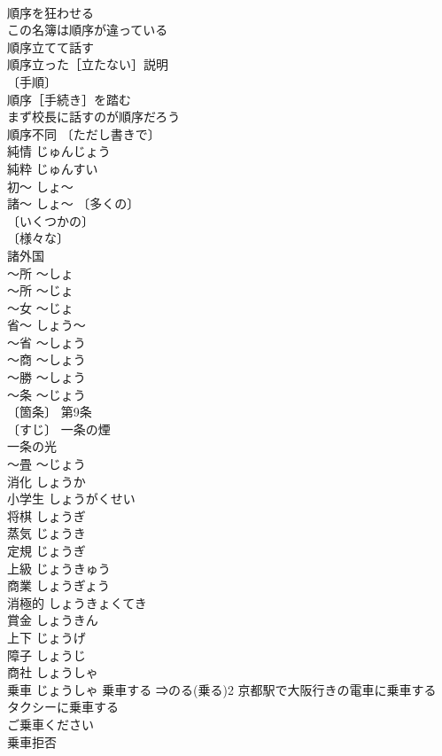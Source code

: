 \documentclass[8pt]{extreport}
\begin{document}
\begin{CJK}{UTF8}{min}
\\	順序を狂わせる 
\\	この名簿は順序が違っている 
\\	順序立てて話す 
\\	順序立った［立たない］説明 
\\	〔手順〕
\\	順序［手続き］を踏む 
\\	まず校長に話すのが順序だろう 
\\	順序不同 〔ただし書きで〕
\\	純情	じゅんじょう	
\\	純粋	じゅんすい	
\\	初～	しょ～	
\\	諸～	しょ～	〔多くの〕
\\	〔いくつかの〕
\\	〔様々な〕
\\	諸外国 
\\	～所	～しょ	
\\	～所	～じょ	
\\	～女	～じょ	
\\	省～	しょう～	
\\	～省	～しょう	
\\	～商	～しょう	
\\	～勝	～しょう	
\\	～条	～じょう	
\\	〔箇条〕 第9条 
\\	〔すじ〕 一条の煙 
\\	一条の光 
\\	～畳	～じょう	
\\	消化	しょうか	
\\	小学生	しょうがくせい	
\\	将棋	しょうぎ	
\\	蒸気	じょうき	
\\	定規	じょうぎ	
\\	上級	じょうきゅう	
\\	商業	しょうぎょう	
\\	消極的	しょうきょくてき	
\\	賞金	しょうきん	
\\	上下	じょうげ	
\\	障子	しょうじ	
\\	商社	しょうしゃ	
\\	乗車	じょうしゃ	乗車する ⇒のる(乗る)2 京都駅で大阪行きの電車に乗車する 
\\	タクシーに乗車する 
\\	ご乗車ください 
\\	乗車拒否 

\end{CJK}
\end{document}
